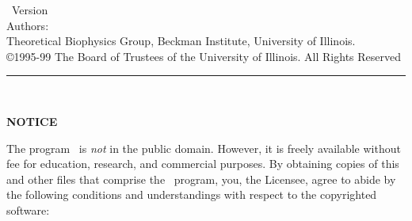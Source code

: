 
\thispagestyle{empty}

\vspace*{0.1in}

\begin{centering}
{\LARGE \NAMD\ Version \NAMDVER}\\
\bigskip
{\large Authors: \NAMDAUTHORS} \\
\medskip
{\large Theoretical Biophysics Group, Beckman Institute, University of Illinois.} \\
\bigskip
{\large \copyright 1995-99 The Board of Trustees of the University of Illinois.
All Rights Reserved} \\
\bigskip
\end{centering}

  \rule{6in}{0.04in}				\\	\vspace{0.25in}

{\bf \LARGE \noindent NOTICE}
\vspace{0.25 in}

\noindent The program \NAMD\ is {\it not\/} in the public domain.
However, it is freely available without fee for
education, research, and commercial purposes.  By obtaining copies
of this and other files that comprise the \NAMD\ program, you, 
the Licensee, agree to abide by the following
conditions and understandings with respect to the copyrighted software:

